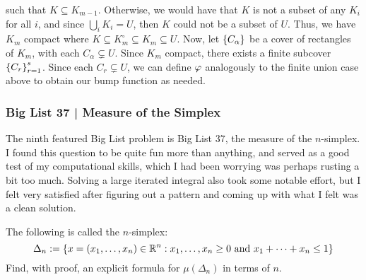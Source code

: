 \begin{soln}
    such that $ K \subseteq K_{m-1} $. Otherwise, we would have that $ K $ is
    not a subset of any $ K_{i} $ for all $ i $, and since $ \bigcup_{i}K_{i}
    = U $, then $ K $ could not be a subset of $ U $. Thus, we have $ K_{m} $
    compact where $ K \subseteq K_{m}^{\circ} \subseteq K_{m} \subseteq U $.
    \vsp
    Now, let $ \left\{{C_{\alpha}}\right\} $ be a cover of rectangles of $ K_{m} $, with
    each $ C_{\alpha} \subsetneq U $. Since $ K_{m} $ compact, there exists a
    finite subcover $ \left\{{C_{r}}\right\}_{r=1}^{s} $. Since each $ C_{r} \subsetneq
    U $, we can define $ \operatorname{\varphi} $ analogously to the finite union case above to
    obtain our bump function as needed.
\end{soln}

\newpage
\subsubsection{Big List 37 | Measure of the Simplex}

The ninth featured Big List problem is Big List 37, the measure of the
$ n $-simplex. I found this question to be quite fun more than anything, and
served as a good test of my computational skills, which I had been worrying was
perhaps rusting a bit too much. Solving a large iterated integral also took some
notable effort, but I felt very satisfied after figuring out a pattern and
coming up with what I felt was a clean solution.

\begin{qu}[title=A Mathematician's Dream,num=37]
    The following is called the $ n $-simplex:
    \begin{equation*}
        \Delta_{n} :=
        \left\{{x = (x_{1}, \dots, x_{n}) \in \mathbb{R}^{n}:
        x_{1}, \dots, x_{n} \geq 0 \textrm{ and } x_{1} + \dots + x_{n} \leq 1}\right\}
    \end{equation*}
    Find, with proof, an explicit formula for $ \mu(\Delta_{n}) $ in terms of
    $ n $.
\end{qu}

